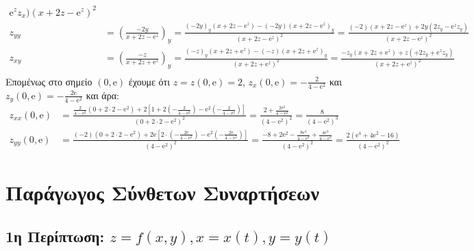 \begin{solution}
\begin{align*}
{        \mathrm{e}^{z} z_{x})}{(x+2z- \mathrm{e}^{z})^{2}}  \\ 
        z_{yy} &= \left(\frac{-2y}{x+2z- \mathrm{e}^{z}}\right)_{y} = 
        \frac{(-2y)_{y}(x+2z- \mathrm{e}^{z})- (-2y)(x+2z- \mathrm{e}^{z} )_{y}}{(x+2z-
          \mathrm{e}^{z} )^{2}} = \frac{(-2)(x+2z- \mathrm{e}^{z} )+2y(2z_{y}-
        \mathrm{e}^{z} z_{y})}{(x+2z- \mathrm{e}^{z})^{2}} \\  
        z_{xy}&= \left(\frac{-z}{x+2z+ \mathrm{e}^{z}}\right)_{y} = 
        \frac{(-z)_{y}(x+2z+ \mathrm{e}^{z})-(-z)(x+2z+ \mathrm{e}^{z} )_{y}}{(x+2z+
          \mathrm{e}^{z})^{2}} = \frac{-z_{y}(x+2z+ \mathrm{e}^{z})+z(+2z_{y}+ 
        \mathrm{e}^{z} z_{y})}{(x+2z+ \mathrm{e}^{z})^{2}}  \\ 
      \end{align*} 
      Επομένως στο σημείο $ (0, \mathrm{e}) $ έχουμε ότι $ z= z(0, \mathrm{e}) = 2 $, 
      $ z_{x}(0, \mathrm{e}) = - \frac{2}{4- \mathrm{e}^{2}} $ και $ z_{y}(0, \mathrm{e}) = 
      - \frac{2 \mathrm{e}}{4 - \mathrm{e}^{2}}$ και άρα:
      \begin{align*}
        z_{xx}(0, \mathrm{e}) &= \frac{ \frac{2}{4-\mathrm{e}^{2}}(0+2\cdot 2-
          \mathrm{e}^{2})+2[1+2 (-\frac{2}{4-\mathrm{e}^{2}}) - \mathrm{e}^{2}
        (-\frac{2}{4-\mathrm{e}^{2}})]}{(0+2 \cdot 2 - \mathrm{e}^{2})^{2}} = 
        \frac{2 + \frac{2 \mathrm{e}^{2}}{4- \mathrm{e}^{2}}}{(4- \mathrm{e}^{2})^{2}} =
        \frac{8}{(4- \mathrm{e}^{2})^{3}} \\
          z_{yy}(0, \mathrm{e}) &= \frac{(-2)(0+2 \cdot 2 - \mathrm{e}^{2})+2 
            \mathrm{e}[2\cdot (-\frac{2 \mathrm{e}}{4- \mathrm{e}^{2}}) - 
            \mathrm{e}^{2} (-\frac{2 \mathrm{e}}{4- \mathrm{e}^{2}})]}{(4- 
            \mathrm{e}^{2})^{2}} = \frac{-8+2 \mathrm{e}^{2}-
            \frac{8e^{2}}{4- \mathrm{e}^{2}}+ \frac{4e^{3}}{4- \mathrm{e}^{2}}}{(4-
            \mathrm{e}^{2})^{2}} = \frac{2(\mathrm{e}^{4} + 4 \mathrm{e}^{2} -16)}{(4-
          \mathrm{e}^{2})^{2}} 
          \end{align*}
        \end{solution}


        \chapter{Παράγωγος Σύνθετων Συναρτήσεων}

        \section{1η Περίπτωση: \ensuremath{z=f(x,y),  x=x(t),  y=y(t)}} 

